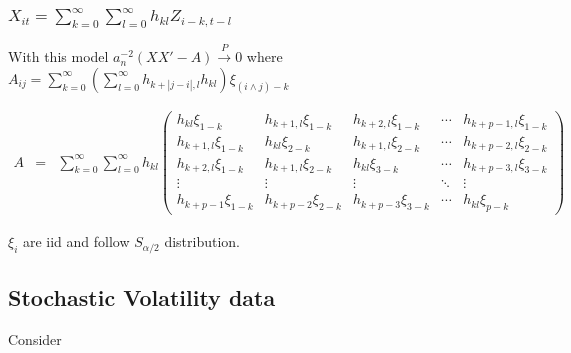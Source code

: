 \documentclass{beamer}
\begin{document}
\begin{frame}
  \frametitle{$X_{it} = \sum_{k=0}^\infty \sum_{l=0}^\infty h_{kl}
    Z_{i-k,t-l}$}
  With this model $a_n^{-2}(XX' - A) \overset{P}{\to} 0$ where
  $A_{ij} = \sum_{k=0}^\infty \left(\sum_{l=0}^\infty h_{k+|j-i|,l}
    h_{kl}\right)\xi_{(i \wedge j) -k}$
  \begin{scriptsize}
    \begin{eqnarray*}
      A &=& \sum_{k=0}^\infty \sum_{l=0}^\infty h_{kl}
      \begin{pmatrix}
        h_{kl} \xi_{1-k} & 
        h_{k+1,l} \xi_{1-k} & 
        h_{k+2,l} \xi_{1-k} & \cdots & h_{k+p-1,l}
        \xi_{1-k}\\
        h_{k+1,l} \xi_{1-k} &
        h_{kl} \xi_{2-k} & 
        h_{k+1,l} \xi_{2-k} & \cdots & h_{k+p-2,l}
        \xi_{2-k}\\
        h_{k+2,l} \xi_{1-k} &
        h_{k+1,l} \xi_{2-k} & 
        h_{kl} \xi_{3-k} & \cdots &
        h_{k+p-3,l} \xi_{3-k}\\
        \vdots & \vdots & \vdots & \ddots & \vdots \\
        h_{k+p-1} \xi_{1-k} & h_{k+p-2} \xi_{2-k} &
        h_{k+p-3} \xi_{3-k} & \cdots & h_{kl} \xi_{p-k}
      \end{pmatrix}
    \end{eqnarray*}
  \end{scriptsize}
  $\xi_i$ are iid and follow $S_{\alpha/2}$ distribution.
\end{frame}

\subsection{Stochastic Volatility data}
Consider



\end{document}
